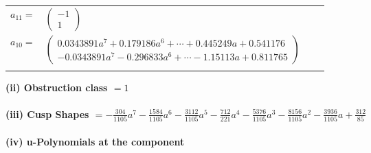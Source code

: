 \documentclass[1p]{elsarticle_modified}
\theoremstyle{definition}
\begin{document}
\begin{tabular}{m{7pt} m{180pt} m{7pt} m{180pt} }
\flushright $a_{11}=$&$\begin{pmatrix}-1\\1\end{pmatrix}$ \\
\flushright $a_{10}=$&$\begin{pmatrix}0.0343891 a^{7}+0.179186 a^{6}+\cdots+0.445249 a+0.541176\\-0.0343891 a^{7}-0.296833 a^{6}+\cdots-1.15113 a+0.811765\end{pmatrix}$\\&\end{tabular}
\flushleft \textbf{(ii) Obstruction class $= 1$}\\~\\
\flushleft \textbf{(iii) Cusp Shapes $= -\frac{304}{1105} a^7-\frac{1584}{1105} a^6-\frac{3112}{1105} a^5-\frac{712}{221} a^4-\frac{5376}{1105} a^3-\frac{8156}{1105} a^2-\frac{3936}{1105} a+\frac{312}{85}$}\\~\\
\newpage\renewcommand{\arraystretch}{1}
\flushleft \textbf{(iv) u-Polynomials at the component}\newline \\
\end{document}
